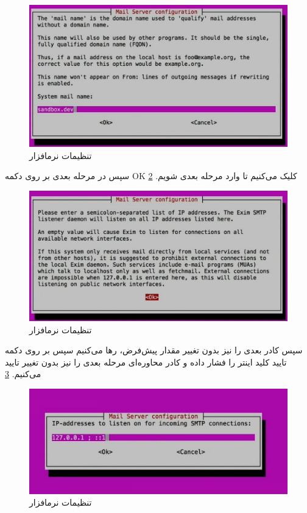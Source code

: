 \begin{figure}
    \includegraphics[width=.9\textwidth ,height=.45\textwidth]{Pic/EXIM2}
    \caption{ تنظیمات نرمافزار 
    }
    \label{MAIL-SERVER-EXIM2}
\end{figure}
سپس در مرحله بعدی بر روی دکمه OK کلیک می‌کنیم تا وارد مرحله بعدی شویم. \ref{MAIL-SERVER-EXIM3}
\begin{figure}
    \includegraphics[width=.9\textwidth ,height=.45\textwidth]{Pic/EXIM3}
    \caption{ تنظیمات نرمافزار 
    }
    \label{MAIL-SERVER-EXIM3}
\end{figure}
سپس کادر بعدی را نیز بدون تغییر مقدار پیش‌فرض، رها می‌کنیم سپس بر روی دکمه تایید کلید اینتر را فشار داده و کادر محاوره‌ای مرحله بعدی را نیز بدون تغییر تایید می‌کنیم. \ref{MAIL-SERVER-EXIM4}
\begin{figure}
    \includegraphics[width=.9\textwidth ,height=.35\textwidth]{Pic/EXIM4}
    \caption{ تنظیمات نرمافزار 
    }
    \label{MAIL-SERVER-EXIM4}
\end{figure}

